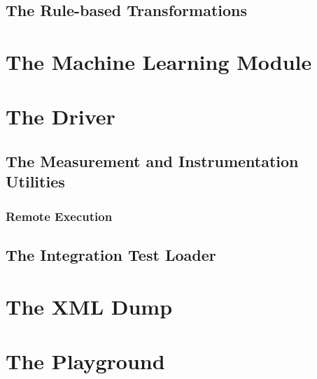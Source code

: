 \subsection{The Rule-based Transformations}

\section{The Machine Learning Module}

\section{The Driver}
\subsection{The Measurement and Instrumentation Utilities}
\subsubsection{Remote Execution}
\subsection{The Integration Test Loader}

\section{The XML Dump}
\section{The Playground}
